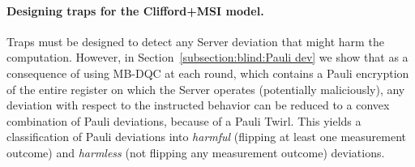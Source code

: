 \paragraph{Designing traps for the Clifford+MSI model.}
Traps must be designed to detect any Server deviation that might harm the computation. However, in Section~\ref{subsection:blind:Pauli dev} we show that as a consequence of using MB-DQC at each round, which contains a Pauli encryption of the entire register on which the Server operates (potentially maliciously), any deviation with respect to the instructed behavior can be reduced to a convex combination of Pauli deviations, because of a Pauli Twirl. This yields a classification of Pauli deviations into \emph{harmful} (flipping at least one measurement outcome) and \emph{harmless} (not flipping any measurement outcome) deviations.

